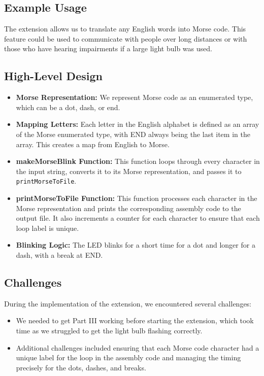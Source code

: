 \documentclass{article}
\begin{document}
\subsection{Example Usage}
The extension allows us to translate any English words into Morse code. This feature could be used to communicate with people over long distances or with those who have hearing impairments if a large light bulb was used.

\subsection{High-Level Design}
\begin{itemize}
    \item \textbf{Morse Representation:} We represent Morse code as an enumerated type, which can be a dot, dash, or end.
    \item \textbf{Mapping Letters:} Each letter in the English alphabet is defined as an array of the Morse enumerated type, with END always being the last item in the array. This creates a map from English to Morse.
    \item \textbf{makeMorseBlink Function:} This function loops through every character in the input string, converts it to its Morse representation, and passes it to \texttt{printMorseToFile}.
    \item \textbf{printMorseToFile Function:} This function processes each character in the Morse representation and prints the corresponding assembly code to the output file. It also increments a counter for each character to ensure that each loop label is unique.
    \item \textbf{Blinking Logic:} The LED blinks for a short time for a dot and longer for a dash, with a break at END.
\end{itemize}

\subsection{Challenges}
During the implementation of the extension, we encountered several challenges:

\begin{itemize}
    \item We needed to get Part III working before starting the extension, which took time as we struggled to get the light bulb flashing correctly.
    \item Additional challenges included ensuring that each Morse code character had a unique label for the loop in the assembly code and managing the timing precisely for the dots, dashes, and breaks.
\end{itemize}
\end{document}
